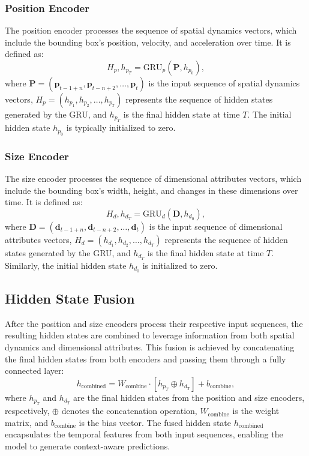 \documentclass[12pt,oneside]{book} %
\begin{document}
\subsubsection*{Position Encoder}
The position encoder processes the sequence of spatial dynamics vectors, which include the bounding box’s position, velocity, and acceleration over time. It is defined as:
\begin{equation}
    H_p, h_{p_T} = \text{GRU}_p(\mathbf{P}, h_{p_0}),
\end{equation}
where $\mathbf{P} = (\mathbf{p}_{t-1+n}, \mathbf{p}_{t-n+2}, \ldots, \mathbf{p}_t)$ is the input sequence of spatial dynamics vectors, $H_p = (h_{p_1}, h_{p_2}, \ldots, h_{p_T})$ represents the sequence of hidden states generated by the GRU, and $h_{p_T}$ is the final hidden state at time $T$. The initial hidden state $h_{p_0}$ is typically initialized to zero.

\subsubsection*{Size Encoder}
The size encoder processes the sequence of dimensional attributes vectors, which include the bounding box’s width, height, and changes in these dimensions over time. It is defined as:
\begin{equation}
    H_d, h_{d_T} = \text{GRU}_d(\mathbf{D}, h_{d_0}),
\end{equation}
where $\mathbf{D} = (\mathbf{d}_{t-1+n}, \mathbf{d}_{t-n+2}, \ldots, \mathbf{d}_t)$ is the input sequence of dimensional attributes vectors, $H_d = (h_{d_1}, h_{d_2}, \ldots, h_{d_T})$ represents the sequence of hidden states generated by the GRU, and $h_{d_T}$ is the final hidden state at time $T$. Similarly, the initial hidden state $h_{d_0}$ is initialized to zero.

\subsection{Hidden State Fusion}
After the position and size encoders process their respective input sequences,
the resulting hidden states are combined to leverage information from both
spatial dynamics and dimensional attributes. This fusion is achieved by
concatenating the final hidden states from both encoders and passing them
through a fully connected layer:
\begin{equation}
    h_{\text{combined}} = W_{\text{combine}} \cdot \left[h_{p_T} \oplus h_{d_T}\right] + b_{\text{combine}},
\end{equation}
where $h_{p_T}$ and $h_{d_T}$ are the final hidden states from the position and size encoders, respectively, $\oplus$ denotes the concatenation operation, $W_{\text{combine}}$ is the weight matrix, and $b_{\text{combine}}$ is the bias vector. The fused hidden state $h_{\text{combined}}$ encapsulates the temporal features from both input sequences, enabling the model to generate context-aware predictions.
\end{document}
